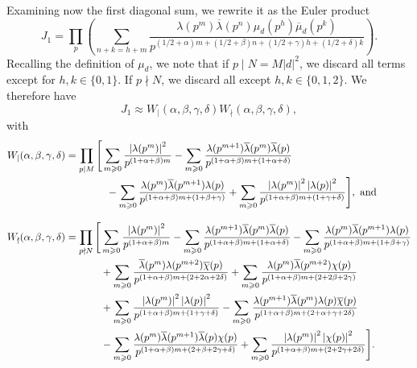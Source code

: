 \documentclass[11pt,reqno]{amsart} \usepackage{fullpage}
\renewcommand{\geq}{\geqslant}
\newcommand\be{\begin{equation}}
\newcommand\ee{\end{equation}}
\numberwithin{equation}{section}
\begin{document}
Examining now the first diagonal sum, we rewrite it as the Euler product
\be J_1=\prod_p
\left(\sum_{n+k=h+m}\frac{\lambda(p^m)\overline\lambda(p^n)\mu_d(p^h)\overline\mu_d(p^k)}
  {p^{(1/2+\alpha)m+(1/2+\beta)n+(1/2+\gamma)h+(1/2+\delta)k}}\right).\ee Recalling the
definition of $\mu_d$, we note that if $p\mid N=M|d|^2$, we discard all terms except for
$h,k\in\{0,1\}$. If $p\nmid N$, we discard all except $h,k\in\{0,1,2\}$. We therefore have
\be J_1\approx W_\mid(\alpha,\beta,\gamma,\delta)W_\nmid(\alpha,\beta,\gamma,\delta),\ee
with
\begin{align}
  &W_\mid(\alpha,\beta,\gamma,\delta)=\prod_{p\mid M}
    \begin{multlined}[t]\Bigg[
      \sum_{m\geq0}\frac{\left|\lambda(p^m)\right|^2}{p^{(1+\alpha+\beta)m}}
      -\sum_{m\geq0}\frac{\lambda(p^{m+1})\overline\lambda(p^m)\overline\lambda(p)}
      {p^{(1+\alpha+\beta)m+(1+\alpha+\delta)}} \\
      -\sum_{m\geq0}\frac{\lambda(p^m)\overline\lambda(p^{m+1})\lambda(p)}
      {p^{(1+\alpha+\beta)m+(1+\beta+\gamma)}}
      +\sum_{m\geq0}\frac{\left|\lambda(p^m)\right|^2\left|\lambda(p)\right|^2}
      {p^{(1+\alpha+\beta)m+(1+\gamma+\delta)}}
      \Bigg],\text{ and}
    \end{multlined} \\
  \intertext{}
  &W_\nmid(\alpha,\beta,\gamma,\delta)=\prod_{p\nmid N}
    \begin{aligned}[t]\Bigg[
      &\sum_{m\geq0}\frac{\left|\lambda(p^m)\right|^2}{p^{(1+\alpha+\beta)m}}
      -\sum_{m\geq0}\frac{\lambda(p^{m+1})\overline\lambda(p^m)\overline\lambda(p)}
      {p^{(1+\alpha+\beta)m+(1+\alpha+\delta)}} 
      -\sum_{m\geq0}\frac{\lambda(p^m)\overline\lambda(p^{m+1})\lambda(p)}
      {p^{(1+\alpha+\beta)m+(1+\beta+\gamma)}} \\
      &+\sum_{m\geq0}\frac{\overline\lambda(p^m)\lambda(p^{m+2})\overline\chi(p)}
      {p^{(1+\alpha+\beta)m+(2+2\alpha+2\delta)}}
      +\sum_{m\geq0}\frac{\lambda(p^m)\overline\lambda(p^{m+2})\chi(p)}
      {p^{(1+\alpha+\beta)m+(2+2\beta+2\gamma)}} \\
      &+\sum_{m\geq0}\frac{\left|\lambda(p^m)\right|^2\left|\lambda(p)\right|^2}
      {p^{(1+\alpha+\beta)m+(1+\gamma+\delta)}}
      -\sum_{m\geq0}\frac{\lambda(p^{m+1})\overline\lambda(p^m)\lambda(p)\overline\chi(p)}
      {p^{(1+\alpha+\beta)m+(2+\alpha+\gamma+2\delta)}} \\
      &-\sum_{m\geq0}\frac{\lambda(p^m)\overline\lambda(p^{m+1})\overline\lambda(p)\chi(p)}
      {p^{(1+\alpha+\beta)m+(2+\beta+2\gamma+\delta)}}
      +\sum_{m\geq0}\frac{\left|\lambda(p^m)\right|^2\left|\chi(p)\right|^2}
      {p^{(1+\alpha+\beta)m+(2+2\gamma+2\delta)}}
      \Bigg].
    \end{aligned}
\end{align}
\end{document}
